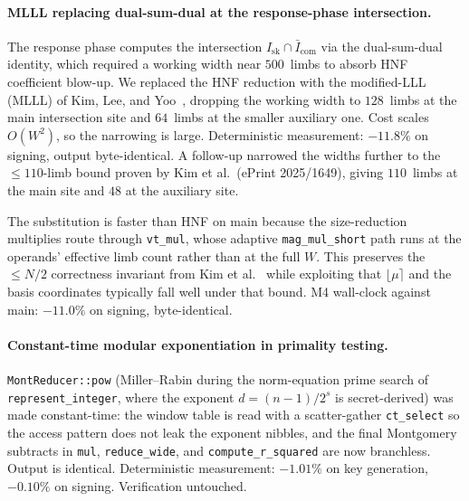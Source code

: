 \paragraph{MLLL replacing dual-sum-dual at the response-phase
intersection.}
The response phase computes the intersection
$I_{\mathrm{sk}} \cap \bar{I}_{\mathrm{com}}$ via the dual-sum-dual
identity, which required a working width near $500$~limbs to absorb
HNF coefficient blow-up.  We replaced the HNF reduction with the
modified-LLL (MLLL) of Kim, Lee, and Yoo~\cite{KLY26}, dropping the
working width to $128$~limbs at the main intersection site and
$64$~limbs at the smaller auxiliary one.  Cost scales $O(W^2)$, so
the narrowing is large.  Deterministic measurement: $-11.8\%$ on
signing, output byte-identical.  A follow-up narrowed the widths
further to the $\leq 110$-limb bound proven by Kim et al.\ (ePrint
2025/1649), giving $110$~limbs at the main site and $48$ at the
auxiliary site.

The substitution is faster than HNF on main because the
size-reduction multiplies route through \texttt{vt\_mul}, whose
adaptive \texttt{mag\_mul\_short} path runs at the operands' effective
limb count rather than at the full $W$.  This preserves the
$\leq N/2$ correctness invariant from Kim et al.~\cite{KLY26} while
exploiting that $\lfloor\mu\rceil$ and the basis coordinates typically
fall well under that bound.  M4 wall-clock against main: $-11.0\%$ on
signing, byte-identical.

\paragraph{Constant-time modular exponentiation in primality testing.}
\texttt{MontReducer::pow} (Miller--Rabin during the norm-equation
prime search of \texttt{represent\_integer}, where the exponent
$d = (n-1)/2^s$ is secret-derived) was made constant-time: the window
table is read with a scatter-gather \texttt{ct\_select} so the access
pattern does not leak the exponent nibbles, and the final Montgomery
subtracts in \texttt{mul}, \texttt{reduce\_wide}, and
\texttt{compute\_r\_squared} are now branchless.  Output is
identical.  Deterministic measurement: $-1.01\%$ on key
generation, $-0.10\%$ on signing.  Verification untouched.

